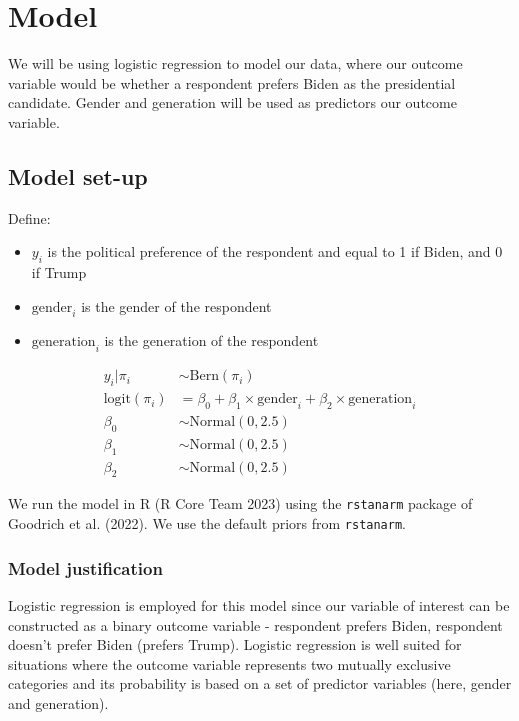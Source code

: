 \documentclass[
  letterpaper,
  DIV=11,
  numbers=noendperiod]{scrartcl}
\begin{document}
\hypertarget{sec-model}{%
\section{Model}\label{sec-model}}

We will be using logistic regression to model our data, where our
outcome variable would be whether a respondent prefers Biden as the
presidential candidate. Gender and generation will be used as predictors
our outcome variable.

\hypertarget{model-set-up}{%
\subsection{Model set-up}\label{model-set-up}}

Define:

\begin{itemize}
\item
  \(y_i\) is the political preference of the respondent and equal to 1
  if Biden, and 0 if Trump
\item
  \(\mbox{gender}_i\) is the gender of the respondent
\item
  \(\mbox{generation}_i\) is the generation of the respondent
\end{itemize}

\begin{align} 
y_i|\pi_i &\sim \mbox{Bern}(\pi_i) \\
\mbox{logit}(\pi_i) &= \beta_0 + \beta_1 \times \mbox{gender}_i +  \beta_2 \times \mbox{generation}_i\\
\beta_0 &\sim \mbox{Normal}(0, 2.5) \\
\beta_1 &\sim \mbox{Normal}(0, 2.5) \\
\beta_2 &\sim \mbox{Normal}(0, 2.5)
\end{align}

We run the model in R (R Core Team 2023) using the \texttt{rstanarm}
package of Goodrich et al. (2022). We use the default priors from
\texttt{rstanarm}.

\hypertarget{model-justification}{%
\subsubsection{Model justification}\label{model-justification}}

Logistic regression is employed for this model since our variable of
interest can be constructed as a binary outcome variable - respondent
prefers Biden, respondent doesn't prefer Biden (prefers Trump). Logistic
regression is well suited for situations where the outcome variable
represents two mutually exclusive categories and its probability is
based on a set of predictor variables (here, gender and generation).
\end{document}
